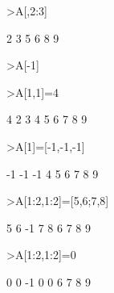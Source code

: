 \documentclass[a4paper,11pt,oneside,enabledeprecatedfontcommands]{scrbook}
\newenvironment{eulernotebook}{}{}
\begin{document}
\begin{eulernotebook}
\begin{eulerprompt}
>A[,2:3]
\end{eulerprompt}
\begin{euleroutput}
            2             3 
            5             6 
            8             9 
\end{euleroutput}
\begin{eulerprompt}
>A[-1]
\end{eulerprompt}
\begin{euleroutput}
[7,  8,  9]
\end{euleroutput}
\begin{eulerprompt}
>A[1,1]=4
\end{eulerprompt}
\begin{euleroutput}
            4             2             3 
            4             5             6 
            7             8             9 
\end{euleroutput}
\begin{eulerprompt}
>A[1]=[-1,-1,-1]
\end{eulerprompt}
\begin{euleroutput}
           -1            -1            -1 
            4             5             6 
            7             8             9 
\end{euleroutput}
\begin{eulerprompt}
>A[1:2,1:2]=[5,6;7,8]
\end{eulerprompt}
\begin{euleroutput}
            5             6            -1 
            7             8             6 
            7             8             9 
\end{euleroutput}
\begin{eulerprompt}
>A[1:2,1:2]=0
\end{eulerprompt}
\begin{euleroutput}
            0             0            -1 
            0             0             6 
            7             8             9 
\end{euleroutput}


\end{eulernotebook}
\end{document}
